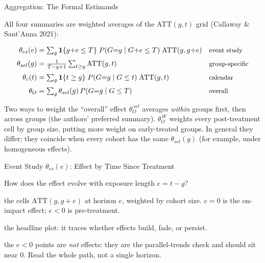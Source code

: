 \documentclass[main.tex]{subfiles}
\begin{document}
\begin{frame}{Aggregation: The Formal Estimands}

  All four summaries are weighted averages of the ATT$(g,t)$ grid
  (Callaway \& Sant'Anna 2021):

  \medskip
  \begin{align*}
    \theta_{es}(e)  &= \textstyle\sum_g \mathbf{1}\{g{+}e \le T\}\;
        P(G{=}g \mid G{+}e \le T)\; \text{ATT}(g, g{+}e)
        && \text{\small event study}\\[2pt]
    \theta_{sel}(g) &= \tfrac{1}{T-g+1}\textstyle\sum_{t \ge g} \text{ATT}(g,t)
        && \text{\small group-specific}\\[2pt]
    \theta_{c}(t)   &= \textstyle\sum_g \mathbf{1}\{t \ge g\}\;
        P(G{=}g \mid G \le t)\; \text{ATT}(g,t)
        && \text{\small calendar}\\[2pt]
    \theta_{O}      &= \textstyle\sum_g \theta_{sel}(g)\,P(G{=}g \mid G \le T)
        && \text{\small overall}
  \end{align*}

  \medskip
  \begin{alertblock}{Two ways to weight the ``overall'' effect}
    $\theta_O^{\,sel}$ averages \emph{within} groups first, then across
    groups (the authors' preferred summary).
    $\theta_O^{\,W}$ weights every post-treatment cell by group size,
    putting more weight on early-treated groups.
    In general they differ; they coincide when every cohort has the same
    $\theta_{sel}(g)$ (for example, under homogeneous effects).
  \end{alertblock}

\end{frame}

\begin{frame}{Event Study $\theta_{es}(e)$: Effect by Time Since Treatment}

  \begin{description}[Averages]
    \item[Question] How does the effect evolve with exposure length $e = t-g$?
    \item[Averages] the cells $\text{ATT}(g,g{+}e)$ at horizon $e$, weighted by
      cohort size. $e{=}0$ is the on-impact effect; $e{<}0$ is pre-treatment.
    \item[Use it] the headline plot: it traces whether effects build, fade, or persist.
    \item[\color{AlertRed}Caveat] the $e{<}0$ points are \emph{not} effects: they
      are the parallel-trends check and should sit near $0$. Read the whole path,
      not a single horizon.
  \end{description}

\end{frame}
\end{document}
